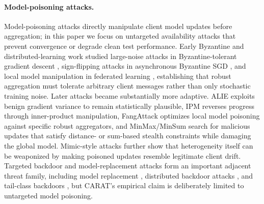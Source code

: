 \documentclass{article}
\begin{document}
\paragraph{Model-poisoning attacks.}
Model-poisoning attacks directly manipulate client model updates before aggregation; in this paper we focus on untargeted availability attacks that prevent convergence or degrade clean test performance. Early Byzantine and distributed-learning work studied large-noise attacks in Byzantine-tolerant gradient descent \citep{blanchard2017krum}, sign-flipping attacks in asynchronous Byzantine SGD \citep{damaskinos2018asynchronous}, and local model manipulation in federated learning \citep{bhagoji2019adversarial}, establishing that robust aggregation must tolerate arbitrary client messages rather than only stochastic training noise. Later attacks became substantially more adaptive. ALIE \citep{baruch2019alie} exploits benign gradient variance to remain statistically plausible, IPM \citep{xie2020ipm} reverses progress through inner-product manipulation, FangAttack \citep{fang2020local} optimizes local model poisoning against specific robust aggregators, and MinMax/MinSum \citep{shejwalkar2021manipulating} search for malicious updates that satisfy distance- or sum-based stealth constraints while damaging the global model. Mimic-style attacks \citep{karimireddy2022bucketing} further show that heterogeneity itself can be weaponized by making poisoned updates resemble legitimate client drift. Targeted backdoor and model-replacement attacks form an important adjacent threat family, including model replacement \citep{bagdasaryan2020backdoor}, distributed backdoor attacks \citep{xie2020dba}, and tail-class backdoors \citep{wang2020tails}, but CARAT's empirical claim is deliberately limited to untargeted model poisoning.
\end{document}
